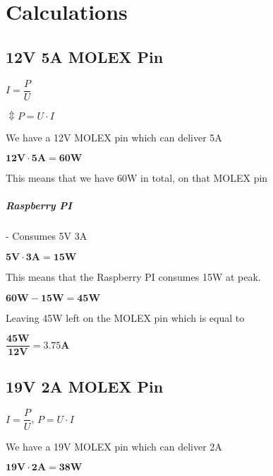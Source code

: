 \chapter{Calculations}



\section{12V 5A MOLEX Pin}

\hspace{3.5mm} $I = \dfrac{P}{U}$

\vspace{2mm}

$\Updownarrow P = U \cdot I$

\vspace{4mm}

We have a 12V MOLEX pin which can deliver 5A

\vspace{2mm}

$\mathbf{12V \cdot 5A = 60W}$

\vspace{2mm}

This means that we have 60W in total, on that MOLEX pin

\vspace{2mm}

\paragraph{Raspberry PI} - Consumes 5V 3A

\vspace{2mm}

$\mathbf{5V \cdot 3A = 15W}$

\vspace{2mm}

This means that the Raspberry PI consumes 15W at peak.

\vspace{2mm}

$\mathbf{60W - 15W = 45W}$

\vspace{4mm}

Leaving 45W left on the MOLEX pin which is equal to

\vspace{2mm}

$\mathbf{\dfrac{45W}{12V} = 3.75A}$

\section{19V 2A MOLEX Pin}

$I = \dfrac{P}{U}$, $P = U \cdot I$

\vspace{4mm}

We have a 19V MOLEX pin which can deliver 2A

\vspace{2mm}

$\mathbf{19V \cdot 2A = 38W}$
 